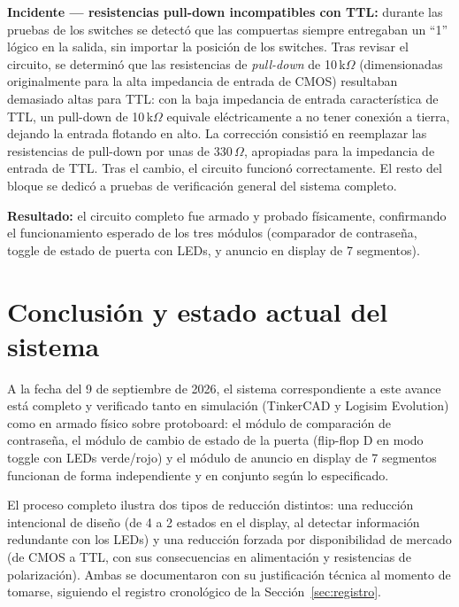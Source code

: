 \documentclass[11pt]{article}
\begin{document}
\textbf{Incidente --- resistencias pull-down incompatibles con TTL:}
durante las pruebas de los switches se detectó que las compuertas
siempre entregaban un ``1'' lógico en la salida, sin importar la
posición de los switches. Tras revisar el circuito, se determinó que las
resistencias de \emph{pull-down} de 10\,k$\Omega$ (dimensionadas
originalmente para la alta impedancia de entrada de CMOS) resultaban
demasiado altas para TTL: con la baja impedancia de entrada
característica de TTL, un pull-down de 10\,k$\Omega$ equivale
eléctricamente a no tener conexión a tierra, dejando la entrada flotando
en alto. La corrección consistió en reemplazar las resistencias de
pull-down por unas de 330\,$\Omega$, apropiadas para la impedancia de
entrada de TTL. Tras el cambio, el circuito funcionó correctamente. El
resto del bloque se dedicó a pruebas de verificación general del sistema
completo.

\textbf{Resultado:} el circuito completo fue armado y probado
físicamente, confirmando el funcionamiento esperado de los tres módulos
(comparador de contraseña, toggle de estado de puerta con LEDs, y
anuncio en display de 7 segmentos).

\section{Conclusión y estado actual del sistema}
\label{sec:conclusion}

A la fecha del 9 de septiembre de 2026, el sistema correspondiente a
este avance está completo y verificado tanto en simulación (TinkerCAD y
Logisim Evolution) como en armado físico sobre protoboard: el módulo de
comparación de contraseña, el módulo de cambio de estado de la puerta
(flip-flop D en modo toggle con LEDs verde/rojo) y el módulo de anuncio
en display de 7 segmentos funcionan de forma independiente y en conjunto
según lo especificado.

El proceso completo ilustra dos tipos de reducción distintos: una
reducción intencional de diseño (de 4 a 2 estados en el display, al
detectar información redundante con los LEDs) y una reducción forzada
por disponibilidad de mercado (de CMOS a TTL, con sus consecuencias en
alimentación y resistencias de polarización). Ambas se documentaron con
su justificación técnica al momento de tomarse, siguiendo el registro
cronológico de la Sección~\ref{sec:registro}.
\end{document}
